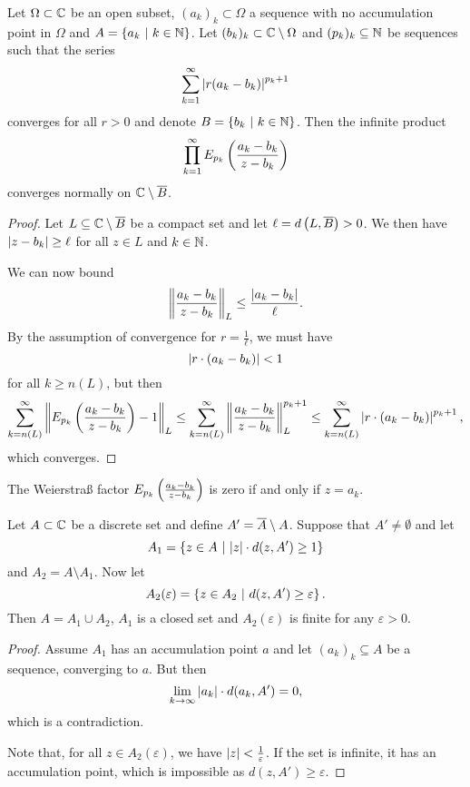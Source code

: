 \obvs

\begin{lema}
\label{inf_prod:lm:w_prod_omega}
Let $\Omega \subset \mathbb{C}$ be an open subset, $(a_k)_k \subset \Omega$
a sequence with no accumulation point in $\Omega$ and
$A = \left\{a_k~\middle\vert~k \in \mathbb{N}\right\}$. Let
$(b_k)_k \subset \mathbb{C} \setminus \Omega$ and $(p_k)_k \subseteq \mathbb{N}$ be
sequences such that the series
\[
\sum_{k=1}^\infty \left\lvert r (a_k - b_k)\right\rvert^{p_k+1}
\]
converges for all $r > 0$ and denote $B = \left\{b_k~\middle\vert~k \in \mathbb{N}\right\}$.
Then the infinite product
\[
\prod_{k=1}^\infty E_{p_k} \left(\frac{a_k - b_k}{z - b_k}\right)
\]
converges normally on $\mathbb{C} \setminus \overline{B}$.
\end{lema}

\begin{proof}
Let $L \subseteq \mathbb{C} \setminus \overline{B}$ be a compact set and let
$\ell = d\left(L, \overline{B}\right) > 0$. We then have
$\left\lvert z - b_k\right\rvert \geq \ell$ for all $z \in L$ and $k \in \mathbb{N}$.

We can now bound
\[
\left\lVert \frac{a_k - b_k}{z - b_k}\right\rVert_L \leq
\frac{\left\lvert a_k - b_k\right\rvert}{\ell}.
\]
By the assumption of convergence for $r = \frac{1}{\ell}$, we must
have
\[
\left\lvert r \cdot (a_k - b_k)\right\rvert < 1
\]
for all $k \geq n(L)$, but then
\[
\sum_{k=n(L)}^\infty
\left\lVert E_{p_k} \left(\frac{a_k - b_k}{z - b_k}\right) - 1\right\rVert_L \leq
\sum_{k=n(L)}^\infty 
\left\lVert \frac{a_k - b_k}{z - b_k}\right\rVert_L^{p_k+1}\leq
\sum_{k=n(L)}^\infty \left\lvert r \cdot \left(a_k - b_k\right)\right\rvert^{p_k+1},
\]
which converges.
\end{proof}

\begin{opomba}
The Weierstraß factor $E_{p_k} \left(\frac{a_k - b_k}{z - b_k}\right)$ is
zero if and only if $z = a_k$.
\end{opomba}

\begin{lema}
\label{inf_prod:lema:divideA}
Let $A \subset \mathbb{C}$ be a discrete set and define
$A' = \overline{A} \setminus A$. Suppose that $A' \ne \emptyset$ and
let
\[
A_1 = \left\{z \in A~\middle\vert~\left\lvert z\right\rvert \cdot d(z, A') \geq 1\right\}
\]
and $A_2 = A \setminus A_1$. Now let
\[
A_2(\varepsilon) = \left\{z \in A_2~\middle\vert~d(z, A') \geq \varepsilon\right\}.
\]
Then $A = A_1 \cup A_2$, $A_1$ is a closed set and $A_2(\varepsilon)$ is finite for any
$\varepsilon > 0$.
\end{lema}

\begin{proof}
Assume $A_1$ has an accumulation point $a$ and let
$(a_k)_k \subseteq A$ be a sequence, converging to $a$. But then
\[
\lim_{k \to \infty} \left\lvert a_k\right\rvert \cdot d(a_k, A') = 0,
\]
which is a contradiction.

Note that, for all $z \in A_2(\varepsilon)$, we have
$\left\lvert z\right\rvert < \frac{1}{\varepsilon}$. If the set is infinite, it has
an accumulation point, which is impossible as
$d(z, A') \geq \varepsilon$.
\end{proof}

